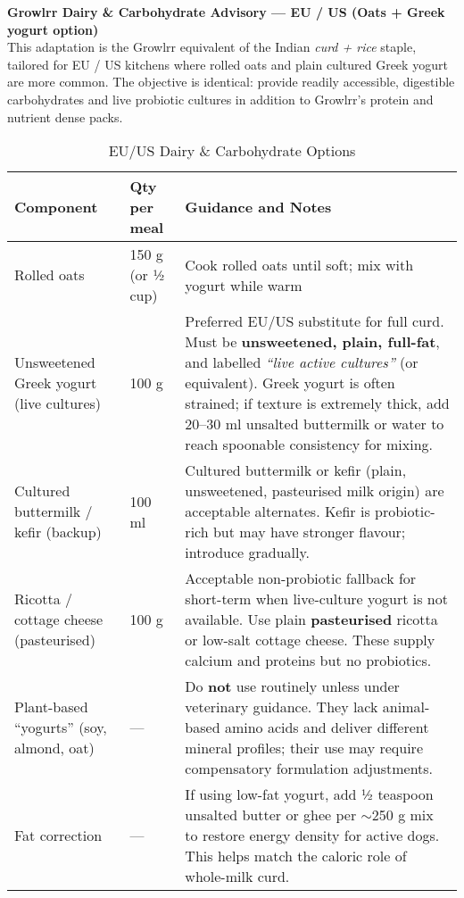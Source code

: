 \vspace{0.5mm}

\begin{flushleft}
\textbf{Growlrr Dairy \& Carbohydrate Advisory — EU / US (Oats + Greek yogurt option)}\\[4pt]
This adaptation is the Growlrr equivalent of the Indian \emph{curd + rice} staple, tailored for EU / US kitchens where rolled oats and plain cultured Greek yogurt are more common. 
The objective is identical: provide readily accessible, digestible carbohydrates and live probiotic cultures in addition to Growlrr's protein and nutrient dense packs. 
\end{flushleft}

\vspace{0.5mm}

\begin{table}[h]
\centering
\caption{EU/US Dairy \& Carbohydrate Options}
\label{tab:eu_us_dairy}
\begin{tabularx}{\linewidth}{@{} p{3cm} p{2.5cm} X @{}}
\toprule
\textbf{Component} & \textbf{Qty per meal} & \textbf{Guidance and Notes} \\
\midrule
Rolled oats & 150 g (or ½ cup) & Cook rolled oats until soft; mix with yogurt while warm\\[4pt]
Unsweetened Greek yogurt (live cultures) & 100 g &
Preferred EU/US substitute for full curd. Must be \textbf{unsweetened, plain, full-fat}, and labelled \emph{``live active cultures''} (or equivalent). Greek yogurt is often strained; if texture is extremely thick, add 20--30 ml unsalted buttermilk or water to reach spoonable consistency for mixing.\\[4pt]
Cultured buttermilk / kefir (backup) & 100 ml &
Cultured buttermilk or kefir (plain, unsweetened, pasteurised milk origin) are acceptable alternates. Kefir is probiotic-rich but may have stronger flavour; introduce gradually.\\[4pt]
Ricotta / cottage cheese (pasteurised) & 100 g &
Acceptable non-probiotic fallback for short-term when live-culture yogurt is not available. Use plain \textbf{pasteurised} ricotta or low-salt cottage cheese. These supply calcium and proteins but no probiotics.\\[4pt]
Plant-based ``yogurts'' (soy, almond, oat) & --- &
Do \textbf{not} use routinely unless under veterinary guidance. They lack animal-based amino acids and deliver different mineral profiles; their use may require compensatory formulation adjustments.\\[4pt]
Fat correction & --- &
If using low-fat yogurt, add ½ teaspoon unsalted butter or ghee per $\sim$250 g mix to restore energy density for active dogs. This helps match the caloric role of whole-milk curd.\\
\bottomrule
\end{tabularx}
\end{table}


